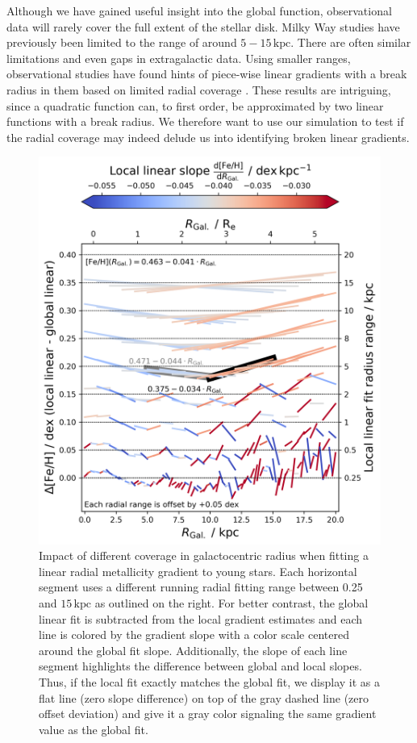 \documentclass[twocolumn,apj,numberedappendix,appendixfloats,twocolappendix]{openjournal}
\begin{document}
\begin{CJK*}{UTF8}{gbsn}
Although we have gained useful insight into the global function, observational data will rarely cover the full extent of the stellar disk. Milky Way studies have previously been limited to the range of around $5-15\,\mathrm{kpc}$. There are often similar limitations and even gaps in extragalactic data. Using smaller ranges, observational studies have found hints of piece-wise linear gradients with a break radius in them based on limited radial coverage \citep[e.g.][]{Andrievsky2002, Yong2012, Boeche2013, Hayden2014, Anders2017, Donor2020, Chen2023}. These results are intriguing, since a quadratic function can, to first order, be approximated by two linear functions with a break radius. We therefore want to use our simulation to test if the radial coverage may indeed delude us into identifying broken linear gradients.

\begin{figure}
    \centering
    \includegraphics[width=\columnwidth]{figures/radial_range_impact.png}
    \caption{Impact of different coverage in galactocentric radius when fitting a linear radial metallicity gradient to young stars. Each horizontal segment uses a different running radial fitting range between 0.25 and $15\,\mathrm{kpc}$ as outlined on the right. For better contrast, the global linear fit is subtracted from the local gradient estimates and each line is colored by the gradient slope with a color scale centered around the global fit slope. Additionally, the slope of each line segment highlights the difference between global and local slopes. Thus, if the local fit exactly matches the global fit, we display it as a flat line (zero slope difference) on top of the gray dashed line (zero offset deviation) and give it a gray color signaling the same gradient value as the global fit.}
    \label{fig:radial_range_impact}
\end{figure}


\end{CJK*}
\end{document}
